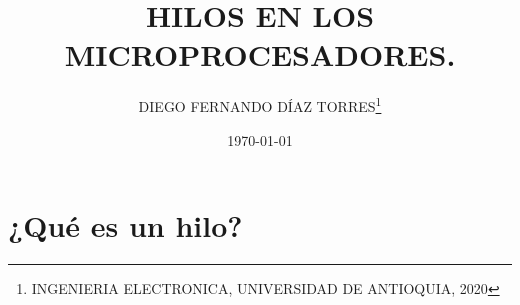 \documentclass[11pt,letterpaper]{article}
\author{DIEGO FERNANDO DÍAZ TORRES\thanks{INGENIERIA ELECTRONICA, UNIVERSIDAD DE ANTIOQUIA, 2020}}
\title{HILOS EN LOS MICROPROCESADORES.}
\date{\today}
\begin{document}
\maketitle










\section*{¿Qué es un hilo?} %


\end{document}
